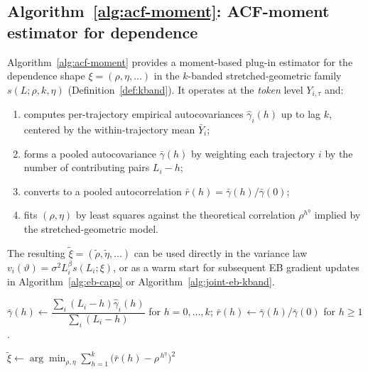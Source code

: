 \subsection{Algorithm~\ref{alg:acf-moment}: ACF-moment estimator for dependence}
Algorithm~\ref{alg:acf-moment} provides a moment-based plug-in estimator for the dependence shape \(\xi=(\rho,\eta,\dots)\) in the $k$-banded stretched-geometric family \(s(L;\rho,k,\eta)\) (Definition~\ref{def:kband}).
It operates at the \emph{token} level \(Y_{i,\tau}\) and:
\begin{enumerate}
  \item computes per-trajectory empirical autocovariances \(\hat\gamma_i(h)\) up to lag \(k\), centered by the within-trajectory mean \(\bar Y_i\);
  \item forms a pooled autocovariance \(\bar\gamma(h)\) by weighting each trajectory \(i\) by the number of contributing pairs \(L_i-h\);
  \item converts to a pooled autocorrelation \(\bar r(h)=\bar\gamma(h)/\bar\gamma(0)\);
  \item fits \((\rho,\eta)\) by least squares against the theoretical correlation \(\rho^{h^\eta}\) implied by the stretched-geometric model.
\end{enumerate}
The resulting \(\tilde\xi=(\tilde\rho,\tilde\eta,\dots)\) can be used directly in the variance law \(v_i(\vartheta)=\sigma^2 L_i^\beta s(L_i;\xi)\), or as a warm start for subsequent EB gradient updates in Algorithm~\ref{alg:eb-capo} or Algorithm~\ref{alg:joint-eb-kband}.

\begin{algorithm}
\DontPrintSemicolon
\caption{ACF-moment estimator for dependence shape (used inside Algorithm~\ref{alg:eb-capo})}
\label{alg:acf-moment}

\(\bar\gamma(h)\gets \dfrac{\sum_i (L_i-h)\hat\gamma_i(h)}{\sum_i (L_i-h)}\) for \(h=0,\dots,k\);\quad
\(\bar r(h)\gets \bar\gamma(h)/\bar\gamma(0)\) for \(h\ge 1\).\;

\(\tilde\xi\gets \arg\min_{\rho,\eta}\sum_{h=1}^k\big(\bar r(h)-\rho^{\,h^{\eta}}\big)^2\)\;
\end{algorithm}

